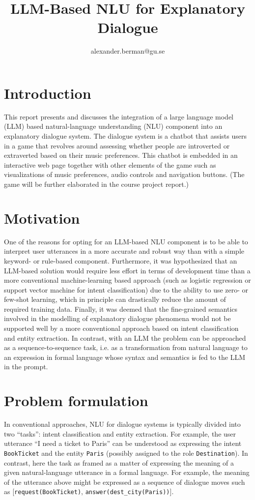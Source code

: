 \documentclass[11pt]{article}
\title{LLM-Based NLU for Explanatory Dialogue}
\author{alexander.berman@gu.se}
\begin{document}
\maketitle

\section{Introduction}
This report presents and discusses the integration of a large language model (LLM) based natural-language understanding (NLU) component into an explanatory dialogue system. The dialogue system is a chatbot that assists users in a game that revolves around assessing whether people are introverted or extraverted based on their music preferences. This chatbot is embedded in an interactive web page together with other elements of the game such as visualizations of music preferences, audio controls and navigation buttons. (The game will be further elaborated in the course project report.)

\section{Motivation}
One of the reasons for opting for an LLM-based NLU component is to be able to interpret user utterances in a more accurate and robust way than with a simple keyword- or rule-based component. Furthermore, it was hypothesized that an LLM-based solution would require less effort in terms of development time than a more conventional machine-learning based approach (such as logistic regression or support vector machine for intent classification) due to the ability to use zero- or few-shot learning, which in principle can drastically reduce the amount of required training data. Finally, it was deemed that the fine-grained semantics involved in the modelling of explanatory dialogue phenomena would not be supported well by a more conventional approach based on intent classification and entity extraction. In contrast, with an LLM the problem can be approached as a sequence-to-sequence task, i.e. as a transformation from natural language to an expression in formal language whose syntax and semantics is fed to the LLM in the prompt.

\section{Problem formulation}
In conventional approaches, NLU for dialogue systems is typically divided into two ``tasks'': intent classification and entity extraction. For example, the user utterance ``I need a ticket to Paris'' can be understood as expressing the intent \texttt{BookTicket} and the entity \texttt{Paris} (possibly assigned to the role \texttt{Destination}). In contrast, here the task as framed as a matter of expressing the meaning of a given natural-language utterance in a formal language. For example, the meaning of the utterance above might be expressed as a sequence of dialogue moves such as [\texttt{request(BookTicket)}, \texttt{answer(dest\_city(Paris))}].
\end{document}

